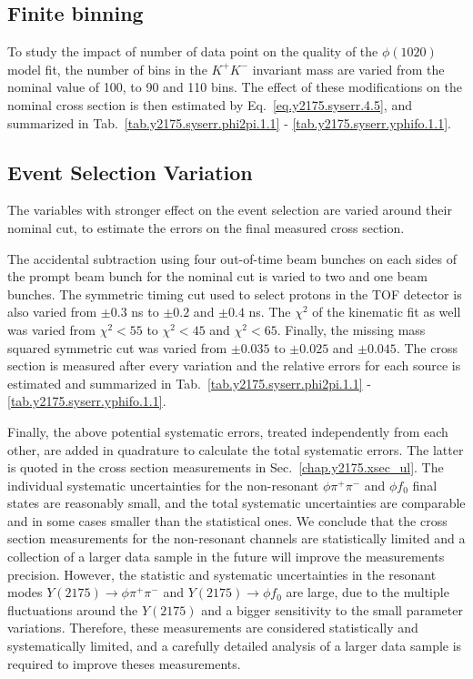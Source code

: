 \subsection{Finite binning}
\label{chap.y2175.syserr.bin}

To study the impact of number of data point on the quality of the $\phi(1020)$ model fit, the number of bins in the $K^+K^-$ invariant mass are varied from the nominal value of 100, to 90 and 110 bins. The effect of these modifications on the nominal cross section is then estimated by Eq.~\ref{eq.y2175.syserr.4.5}, and summarized in Tab.~\ref{tab.y2175.syserr.phi2pi.1.1} - \ref{tab.y2175.syserr.yphifo.1.1}.

\subsection{Event Selection Variation}
\label{chap.y2175.syserr.evt}

The variables with stronger effect on the event selection are varied around their nominal cut, to estimate the errors on the final measured cross section.
\par The accidental subtraction using four out-of-time beam bunches on each sides of the prompt beam bunch for the nominal cut is varied to two and one beam bunches. The symmetric timing cut used to select protons in the TOF detector is also varied from $\pm 0.3$ ns to $\pm 0.2$ and $\pm 0.4$ ns. The $\chi^2$ of the kinematic fit as well was varied from $\chi^{2}<55$ to $\chi^{2}<45$ and $\chi^{2}<65$. Finally, the missing mass squared symmetric cut was varied from $\pm 0.035$ to $\pm 0.025$ and $\pm 0.045$. The cross section is measured after every variation and the relative errors for each source is estimated and summarized in Tab.~\ref{tab.y2175.syserr.phi2pi.1.1} - \ref{tab.y2175.syserr.yphifo.1.1}.
~\par Finally, the above potential systematic errors, treated independently from each other, are added in quadrature to calculate the total systematic errors. The latter is quoted in the cross section measurements in Sec.~\ref{chap.y2175.xsec_ul}. The individual systematic uncertainties for the non-resonant $\phi \pi^{+} \pi^{-}$ and $\phi f_0$ final states are reasonably small, and the total systematic uncertainties are comparable and in some cases smaller than the statistical ones. We conclude that the cross section measurements for the non-resonant channels are statistically limited and a collection of a larger data sample in the future will improve the measurements precision. However, the statistic and systematic uncertainties in the resonant modes $Y(2175) \rightarrow \phi \pi^{+} \pi^{-}$ and $Y(2175) \rightarrow \phi f_0$ are large, due to the multiple fluctuations around the $Y(2175)$ and a bigger sensitivity to the small parameter variations. Therefore, these measurements are considered statistically and systematically limited, and a carefully detailed analysis of a larger data sample is required to improve theses measurements.

